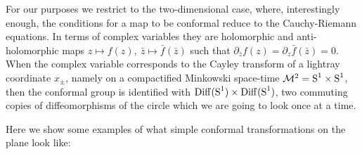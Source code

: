 \bigskip
For our purposes we restrict to the two-dimensional case, 
where, interestingly enough, the conditions for a map to be 
conformal reduce to the Cauchy-Riemann equations. In terms of 
complex variables they are holomorphic and anti-holomorphic maps
$z\mapsto f(z),\ \bar{z}\mapsto \bar{f}(\bar{z})$ such that
$\partial_{\bar{z}}f(z)=\partial_{z}\bar{f}(\bar{z})=0$.
When the complex variable corresponds to the Cayley transform
of a lightray coordinate $x_{\pm}$, namely on a compactified
Minkowski space-time $\mathcal{M}^2=\textrm{S}^1\times\textrm{S}^1$, then the conformal group
is identified with $\operatorname{Diff}(\textrm{S}^1)\times \operatorname{Diff}(\textrm{S}^1)$, two commuting
copies of diffeomorphisms of the circle which we are going to
look once at a time.
\begin{example}
Here we show some examples of what simple conformal 
transformations on the plane look like:


\end{example}
